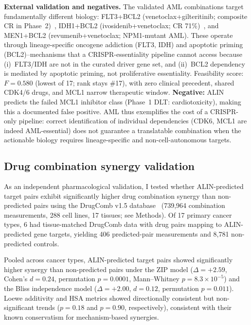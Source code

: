 \documentclass[times, twoside, watermark]{zHenriquesLab-StyleBioRxiv}
\begin{document}
\textbf{External validation and negatives.} The validated AML combinations target fundamentally different biology: FLT3+BCL2 (venetoclax+gilteritinib; composite CR in Phase~2)~\cite{Daver2022}, IDH1+BCL2 (ivosidenib+venetoclax; CR 71\%)~\cite{DiNardo2021}, and MEN1+BCL2 (revumenib+venetoclax; NPM1-mutant AML). These operate through lineage-specific oncogene addiction (FLT3, IDH) and apoptotic priming (BCL2)--mechanisms that a CRISPR-essentiality pipeline cannot access because (i)~FLT3/IDH are not in the curated driver gene set, and (ii)~BCL2 dependency is mediated by apoptotic priming, not proliferative essentiality. Feasibility score: $F = 0.580$ (lowest of 17; rank stays \#17), with zero clinical precedent, shared CDK4/6 drugs, and MCL1 narrow therapeutic window. \textbf{Negative:} ALIN predicts the failed MCL1 inhibitor class (Phase~1 DLT: cardiotoxicity), making this a documented false positive. AML thus exemplifies the cost of a CRISPR-only pipeline: correct identification of individual dependencies (CDK6, MCL1 are indeed AML-essential) does not guarantee a translatable combination when the actionable biology requires lineage-specific and non-cell-autonomous targets.

\subsection*{Drug combination synergy validation}
As an independent pharmacological validation, I tested whether ALIN-predicted target pairs exhibit significantly higher drug combination synergy than non-predicted pairs using the DrugComb v1.5 database~\cite{Zagidullin2019,Zheng2022} (739{,}964 combination measurements, 288 cell lines, 17 tissues; see Methods). Of 17 primary cancer types, 6 had tissue-matched DrugComb data with drug pairs mapping to ALIN-predicted gene targets, yielding 406 predicted-pair measurements and 8{,}781 non-predicted controls.

Pooled across cancer types, ALIN-predicted target pairs showed significantly higher synergy than non-predicted pairs under the ZIP model ($\Delta = +2.59$, Cohen's $d = 0.24$, permutation $p = 0.0001$, Mann--Whitney $p = 8.3 \times 10^{-5}$) and the Bliss independence model ($\Delta = +2.00$, $d = 0.12$, permutation $p = 0.011$). Loewe additivity and HSA metrics showed directionally consistent but non-significant trends ($p = 0.18$ and $p = 0.90$, respectively), consistent with their known conservatism for mechanism-based synergies.
\end{document}
